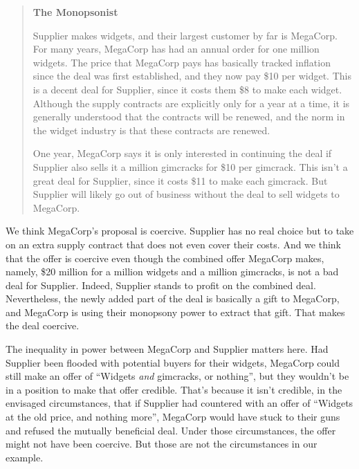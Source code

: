 \documentclass[
  11pt,
  letterpaper,
  DIV=11,
  numbers=noendperiod,
  oneside]{scrartcl}
\begin{document}
\begin{quote}
\textbf{The Monopsonist}

Supplier makes widgets, and their largest customer by far is MegaCorp.
For many years, MegaCorp has had an annual order for one million
widgets. The price that MegaCorp pays has basically tracked inflation
since the deal was first established, and they now pay \$10 per widget.
This is a decent deal for Supplier, since it costs them \$8 to make each
widget. Although the supply contracts are explicitly only for a year at
a time, it is generally understood that the contracts will be renewed,
and the norm in the widget industry is that these contracts are renewed.

One year, MegaCorp says it is only interested in continuing the deal if
Supplier also sells it a million gimcracks for \$10 per gimcrack. This
isn't a great deal for Supplier, since it costs \$11 to make each
gimcrack. But Supplier will likely go out of business without the deal
to sell widgets to MegaCorp.
\end{quote}

We think MegaCorp's proposal is coercive. Supplier has no real choice
but to take on an extra supply contract that does not even cover their
costs. And we think that the offer is coercive even though the combined
offer MegaCorp makes, namely, \$20 million for a million widgets and a
million gimcracks, is not a bad deal for Supplier. Indeed, Supplier
stands to profit on the combined deal. Nevertheless, the newly added
part of the deal is basically a gift to MegaCorp, and MegaCorp is using
their monopsony power to extract that gift. That makes the deal
coercive.

The inequality in power between MegaCorp and Supplier matters here. Had
Supplier been flooded with potential buyers for their widgets, MegaCorp
could still make an offer of ``Widgets \emph{and} gimcracks, or
nothing'', but they wouldn't be in a position to make that offer
credible. That's because it isn't credible, in the envisaged
circumstances, that if Supplier had countered with an offer of ``Widgets
at the old price, and nothing more'', MegaCorp would have stuck to their
guns and refused the mutually beneficial deal. Under those circumstances, the offer might not
have been coercive. But those are not the circumstances in our example.
\end{document}
